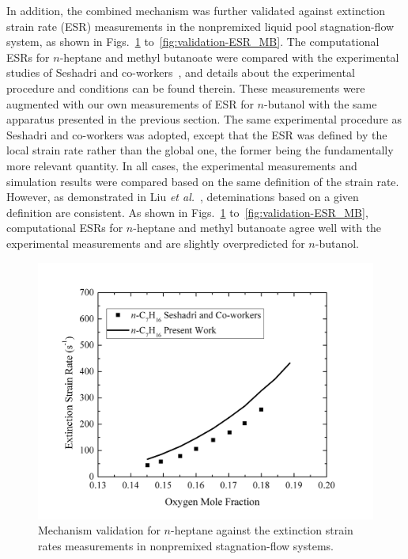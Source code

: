 In addition, the combined mechanism was further validated against extinction strain rate (ESR) measurements in the nonpremixed liquid pool stagnation-flow system, as shown in Figs.~\ref{fig:validation-ESR_NH} to~\ref{fig:validation-ESR_MB}.  The computational ESRs for $n$-heptane and methyl butanoate were compared with the experimental studies of Seshadri and co-workers~\cite{seshadri08,niemann10}, and details about the experimental procedure and conditions can be found therein.  These measurements were augmented with our own measurements of ESR for $n$-butanol with the same apparatus presented in the previous section.  The same experimental procedure as Seshadri and co-workers was adopted, except that the ESR was defined by the local strain rate rather than the global one, the former being the fundamentally more relevant quantity.  In all cases, the experimental measurements and simulation results were compared based on the same definition of the strain rate.  However, as demonstrated in Liu \emph{et al.}~\cite{liu11b}, deteminations based on a given definition are consistent.  As shown in Figs.~\ref{fig:validation-ESR_NH} to~\ref{fig:validation-ESR_MB}, computational ESRs for $n$-heptane and methyl butanoate agree well with the experimental measurements and are slightly overpredicted for $n$-butanol.  

\begin{figure}[t]
  \centering
  \scriptsize
  \includegraphics[width=1.0\textwidth]{ch-biofuel/NH-ESR.png}
  \normalsize
  \caption{Mechanism validation for $n$-heptane against the extinction strain rates measurements in nonpremixed stagnation-flow systems.}
  \label{fig:validation-ESR_NH}
\end{figure}


